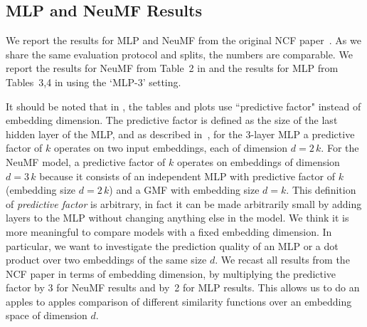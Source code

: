 \documentclass{article}
\begin{document}
\subsection{MLP and NeuMF Results}

We report the results for MLP and NeuMF from the original NCF paper~\cite{he:www17}.
As we share the same evaluation protocol and splits, the numbers are comparable.
We report the results for NeuMF from Table~2 in \cite{he:www17} and the results for MLP from Tables~3,4 in \cite{he:www17} using the `MLP-3' setting.

\label{sec:predictive_factor}
It should be noted that in \cite{he:www17}, the tables and plots use ``predictive factor" instead of embedding dimension. The predictive factor is defined as the size of the last hidden layer of the MLP, and as described in~\cite{he:www17}, for the 3-layer MLP a predictive factor of $k$ operates on two input embeddings, each of dimension $d=2\,k$.
For the NeuMF model, a predictive factor of $k$ operates on embeddings of dimension $d=3\,k$ because it consists of an independent MLP with predictive factor of $k$ (embedding size $d=2\,k$) and a GMF with embedding size $d=k$.
This definition of \emph{predictive factor} is arbitrary, in fact it can be made arbitrarily small by adding layers to the MLP without changing anything else in the model.
We think it is more meaningful to compare models with a fixed embedding dimension.
In particular, we want to investigate the prediction quality of an MLP or a dot product over two embeddings of the same size $d$.
We recast all results from the NCF paper in terms of embedding dimension, by multiplying the predictive factor by 3 for NeuMF results and by~2 for MLP results.
This allows us to do an apples to apples comparison of different similarity functions over an embedding space of dimension $d$.
\end{document}
